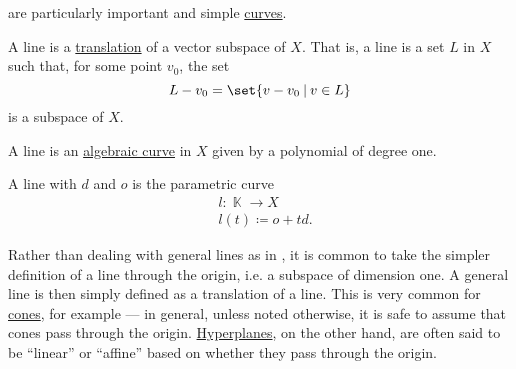 \begin{definition}\label{def:geometric_line}\mimprovised
   are particularly important and simple \hyperref[rem:geometric_shape]{curves}.

  \begin{thmenum}
     A line is a \hyperref[def:rigid_motion/translation]{translation} of a vector subspace of \( X \). That is, a line is a set \( L \) in \( X \) such that, for some point \( v_0 \), the set
    \begin{equation*}
      L - v_0 = \set{ v - v_0 \given v \in L }
    \end{equation*}
    is a subspace of \( X \).

     A line is an \hyperref[def:affine_algebraic_set/curve]{algebraic curve} in \( X \) given by a polynomial of degree one.

     A line with  \( d \) and  \( o \) is the parametric curve
    \begin{equation*}
      \begin{aligned}
        &l: \BbbK \to X   \\
        &l(t) \coloneqq o + t d.
      \end{aligned}
    \end{equation*}
  \end{thmenum}
\end{definition}

\begin{remark}\label{rem:figure_through_origin}
  Rather than dealing with general lines as in , it is common to take the simpler definition of a line through the origin, i.e. a subspace of dimension one. A general line is then simply defined as a translation of a line. This is very common for \hyperref[def:geometric_cone]{cones}, for example --- in general, unless noted otherwise, it is safe to assume that cones pass through the origin. \hyperref[def:hyperplane]{Hyperplanes}, on the other hand, are often said to be \enquote{linear} or \enquote{affine} based on whether they pass through the origin.
\end{remark}

